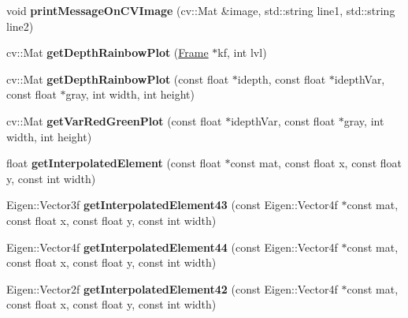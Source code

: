 \begin{DoxyCompactItemize}
\item 
\hypertarget{namespacelsd__slam_a8fcffb6cde75efe7c1788bbebb88bb54}{void {\bfseries print\-Message\-On\-C\-V\-Image} (cv\-::\-Mat \&image, std\-::string line1, std\-::string line2)}\label{namespacelsd__slam_a8fcffb6cde75efe7c1788bbebb88bb54}

\item 
\hypertarget{namespacelsd__slam_a699e635cef540700a81a4c63c121399d}{cv\-::\-Mat {\bfseries get\-Depth\-Rainbow\-Plot} (\hyperlink{classlsd__slam_1_1_frame}{Frame} $\ast$kf, int lvl)}\label{namespacelsd__slam_a699e635cef540700a81a4c63c121399d}

\item 
\hypertarget{namespacelsd__slam_abc1c09ca535f372008a7d6a247ea87e4}{cv\-::\-Mat {\bfseries get\-Depth\-Rainbow\-Plot} (const float $\ast$idepth, const float $\ast$idepth\-Var, const float $\ast$gray, int width, int height)}\label{namespacelsd__slam_abc1c09ca535f372008a7d6a247ea87e4}

\item 
\hypertarget{namespacelsd__slam_a9f9e78d7b61ab8f66a93de7f7afcd479}{cv\-::\-Mat {\bfseries get\-Var\-Red\-Green\-Plot} (const float $\ast$idepth\-Var, const float $\ast$gray, int width, int height)}\label{namespacelsd__slam_a9f9e78d7b61ab8f66a93de7f7afcd479}

\item 
\hypertarget{namespacelsd__slam_ab210d32506887e44c440c68b25568ab3}{float {\bfseries get\-Interpolated\-Element} (const float $\ast$const mat, const float x, const float y, const int width)}\label{namespacelsd__slam_ab210d32506887e44c440c68b25568ab3}

\item 
\hypertarget{namespacelsd__slam_a5db87d3b1adf58dbac386d1bb667971e}{Eigen\-::\-Vector3f {\bfseries get\-Interpolated\-Element43} (const Eigen\-::\-Vector4f $\ast$const mat, const float x, const float y, const int width)}\label{namespacelsd__slam_a5db87d3b1adf58dbac386d1bb667971e}

\item 
\hypertarget{namespacelsd__slam_aa48a4b6cc7e2f4a99056fd3fb9f573cb}{Eigen\-::\-Vector4f {\bfseries get\-Interpolated\-Element44} (const Eigen\-::\-Vector4f $\ast$const mat, const float x, const float y, const int width)}\label{namespacelsd__slam_aa48a4b6cc7e2f4a99056fd3fb9f573cb}

\item 
\hypertarget{namespacelsd__slam_a0388a1bf084d3fe8136aa11bc2206a2e}{Eigen\-::\-Vector2f {\bfseries get\-Interpolated\-Element42} (const Eigen\-::\-Vector4f $\ast$const mat, const float x, const float y, const int width)}\label{namespacelsd__slam_a0388a1bf084d3fe8136aa11bc2206a2e}


\end{DoxyCompactItemize}
